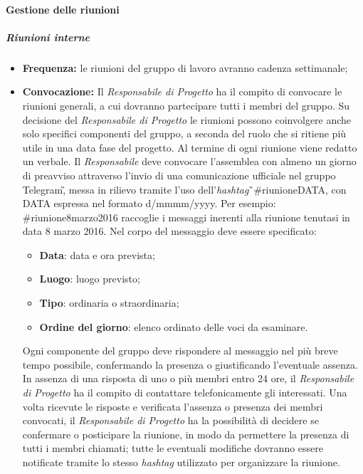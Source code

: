 \paragraph{Gestione delle riunioni}
\subparagraph{Riunioni interne}
\begin{itemize}
\item \textbf{Frequenza:} le riunioni del gruppo di lavoro avranno cadenza settimanale; 

\item \textbf{Convocazione:} Il \textit{Responsabile di Progetto} ha il compito di convocare le riunioni generali, a 
cui dovranno partecipare tutti i membri del gruppo.
Su decisione del \textit{Responsabile di Progetto} le riunioni possono coinvolgere anche 
solo specifici componenti del gruppo, a seconda del ruolo che si ritiene più 
utile in una data fase del progetto. Al termine di ogni riunione viene redatto 
un verbale.
Il \textit{Responsabile} deve convocare l'assemblea con almeno un giorno di preavviso
attraverso l'invio di una comunicazione ufficiale nel gruppo Telegram\G, messa in rilievo tramite l'uso dell'\textit{hashtag}\G\ \#riunioneDATA, 
con DATA espressa nel formato d/mmmm/yyyy. Per esempio: \#riunione8marzo2016 raccoglie i messaggi inerenti alla riunione tenutasi in data 8 marzo 2016. Nel corpo del messaggio deve essere specificato:
\begin{itemize}
	\item \textbf{Data}: data e ora prevista;
	\item \textbf{Luogo}: luogo previsto;
	\item \textbf{Tipo}: ordinaria o straordinaria;
	\item \textbf{Ordine del giorno}: elenco ordinato delle voci da esaminare.
\end{itemize}

Ogni componente del gruppo deve rispondere al messaggio nel più breve tempo possibile, confermando la presenza o giustificando l'eventuale assenza. In assenza di una risposta di uno o più membri entro 24 ore, il \textit{Responsabile di Progetto} ha il compito di contattare telefonicamente gli interessati. Una volta ricevute le 
risposte e verificata l'assenza o presenza dei membri convocati, il 
\textit{Responsabile di Progetto} ha la possibilità di decidere se confermare o 
posticipare la riunione, in modo da permettere la presenza di tutti i membri chiamati; 
tutte le eventuali modifiche dovranno essere notificate tramite lo stesso \textit{hashtag} utilizzato per organizzare la riunione. 


\end{itemize}
